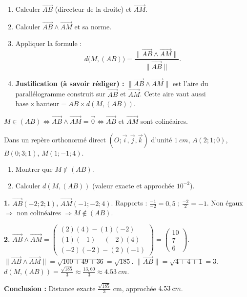 \documentclass[11pt]{article}
\begin{document}
\begin{methode}
\begin{enumerate}
\item Calculer $\overrightarrow{AB}$ (directeur de la droite) et $\overrightarrow{AM}$.
\item Calculer $\overrightarrow{AB}\wedge\overrightarrow{AM}$ et sa norme.
\item Appliquer la formule :
\[
d\big(M,(AB)\big) = \frac{\|\overrightarrow{AB}\wedge\overrightarrow{AM}\|}{\|\overrightarrow{AB}\|}.
\]
\item \textbf{Justification (à savoir rédiger) :} $\|\overrightarrow{AB}\wedge\overrightarrow{AM}\|$ est l'aire du parallélogramme construit sur $\overrightarrow{AB}$ et $\overrightarrow{AM}$. Cette aire vaut aussi $\text{base}\times\text{hauteur} = AB \times d(M,(AB))$.
\end{enumerate}
\end{methode}

\begin{aretenir}
$M \in (AB) \iff \overrightarrow{AB}\wedge\overrightarrow{AM} = \vec{0} \iff \overrightarrow{AB}$ et $\overrightarrow{AM}$ sont colinéaires.
\end{aretenir}

\begin{exoresolu}
Dans un repère orthonormé direct $(O;\vec{i},\vec{j},\vec{k})$ d'unité $\SI{1}{cm}$, $A(2;1;0)$, $B(0;3;1)$, $M(1;-1;4)$.
\begin{enumerate}
\item Montrer que $M \notin (AB)$.
\item Calculer $d(M,(AB))$ (valeur exacte et approchée $10^{-2}$).
\end{enumerate}
\tcblower
\textbf{1.} $\overrightarrow{AB}(-2;2;1)$, $\overrightarrow{AM}(-1;-2;4)$.
Rapports : $\frac{-1}{-2}=0,5$ ; $\frac{-2}{2}=-1$. Non égaux $\Rightarrow$ non colinéaires $\Rightarrow M\notin(AB)$.

\textbf{2.} $\overrightarrow{AB}\wedge\overrightarrow{AM} =
\begin{pmatrix}
(2)(4)-(1)(-2) \\
(1)(-1)-(-2)(4) \\
(-2)(-2)-(2)(-1)
\end{pmatrix}
=
\begin{pmatrix}
10 \\ 7 \\ 6
\end{pmatrix}
$.
$\|\overrightarrow{AB}\wedge\overrightarrow{AM}\| = \sqrt{100+49+36} = \sqrt{185}$.
$\|\overrightarrow{AB}\| = \sqrt{4+4+1} = 3$.
$d(M,(AB)) = \frac{\sqrt{185}}{3} \approx \frac{13,60}{3} \approx \SI{4,53}{cm}$.

\textbf{Conclusion :} Distance exacte $\frac{\sqrt{185}}{3}$ cm, approchée $\SI{4,53}{cm}$.
\end{exoresolu}
\end{document}
